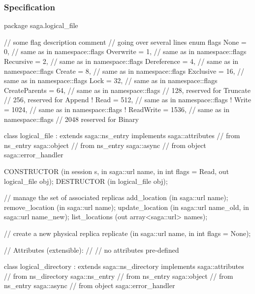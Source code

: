  \subsubsection{Specification}
 
 \begin{myspec}
  package saga.logical_file
  {
    // some flag description comment
    // going over several lines
    enum flags
    {
      None            =    0, // same as in namespace::flags
      Overwrite       =    1, // same as in namespace::flags
      Recursive       =    2, // same as in namespace::flags
      Dereference     =    4, // same as in namespace::flags
      Create          =    8, // same as in namespace::flags
      Exclusive       =   16, // same as in namespace::flags
      Lock            =   32, // same as in namespace::flags
      CreateParents   =   64, // same as in namespace::flags
      //                 128,    reserved for Truncate
      //                 256,    reserved for Append
!     Read            =  512, // same as in namespace::flags 
!     Write           = 1024, // same as in namespace::flags 
!     ReadWrite       = 1536, // same as in namespace::flags 
      //                2048     reserved for Binary
    }
 
 
    class logical_file : extends        saga::ns_entry
                         implements     saga::attributes
                      // from ns_entry  saga::object
                      // from ns_entry  saga::async
                      // from object    saga::error_handler
    {
      CONSTRUCTOR     (in  session             s,
                       in  saga::url           name,
                       in  int                 flags = Read,
                       out logical_file        obj);
      DESTRUCTOR      (in  logical_file        obj);
 
 
      // manage the set of associated replicas
      add_location    (in  saga::url           name);
      remove_location (in  saga::url           name);
      update_location (in  saga::url           name_old,
                       in  saga::url           name_new);
      list_locations  (out array<saga::url>    names);
 
      // create a new physical replica
      replicate       (in  saga::url           name, 
                       in  int                 flags = None);
 
      // Attributes (extensible):
      // 
      // no attributes pre-defined
    }
 
 
    class logical_directory : extends            saga::ns_directory
                              implements         saga::attributes
                           // from ns_directory  saga::ns_entry
                           // from ns_entry      saga::object
                           // from ns_entry      saga::async
                           // from object        saga::error_handler
    {
 
}}
\end{myspec}
